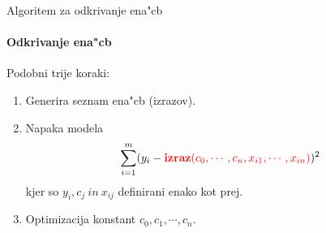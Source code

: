 \documentclass[t,usenames,dvipsnames]{beamer} %
\begin{document}





\begin{frame}{Algoritem za odkrivanje ena"cb}
\framesubtitle{Odkrivanje ena"cb}
Podobni trije koraki:
	\begin{enumerate}
	\item Generira seznam ena"cb (izrazov).
	\item Napaka modela \[ \sum_{i=1} ^m (y _i - \textcolor{red}{\textbf{izraz}(c_0, \cdots,  c_n, x_{i1}, \cdots, x_{in})})^2  \]
kjer so \( y_i, c_j\ in\ x_{ij} \)
definirani enako kot prej.
	\item Optimizacija konstant \( c_0, c_1, \cdots, c_n \).
	\end{enumerate}
\end{frame}
\end{document}
